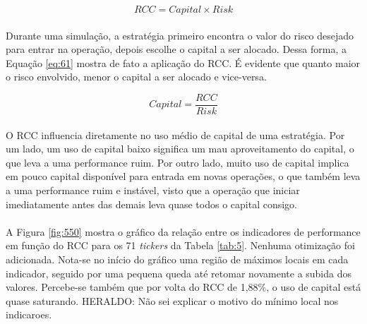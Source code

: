 \begin{equation} \label{eq:60}
    RCC = Capital \times Risk
\end{equation}

\paragraph{} Durante uma simulação, a estratégia primeiro encontra o valor do risco desejado para entrar na operação, depois escolhe o capital a ser alocado. Dessa forma, a Equação \ref{eq:61} mostra de fato a aplicação do RCC. É evidente que quanto maior o risco envolvido, menor o capital a ser alocado e vice-versa.

\begin{equation} \label{eq:61}
    Capital = \dfrac{RCC}{Risk}
\end{equation}

\paragraph{} O RCC influencia diretamente no uso médio de capital de uma estratégia. Por um lado, um uso de capital baixo significa um mau aproveitamento do capital, o que leva a uma performance ruim. Por outro lado, muito uso de capital implica em pouco capital disponível para entrada em novas operações, o que também leva a uma performance ruim e instável, visto que a operação que iniciar imediatamente antes das demais leva quase todos o capital consigo.

\paragraph{} A Figura \ref{fig:550} mostra o gráfico da relação entre os indicadores de performance em função do RCC para os 71 \textit{tickers} da Tabela \ref{tab:5}. Nenhuma otimização foi adicionada. Nota-se no início do gráfico uma região de máximos locais em cada indicador, seguido por uma pequena queda até retomar novamente a subida dos valores. Percebe-se também que por volta do RCC de 1,88\%, o uso de capital está quase saturando. \color{red} HERALDO: Não sei explicar o motivo do mínimo local nos indicaroes. \color{black}


